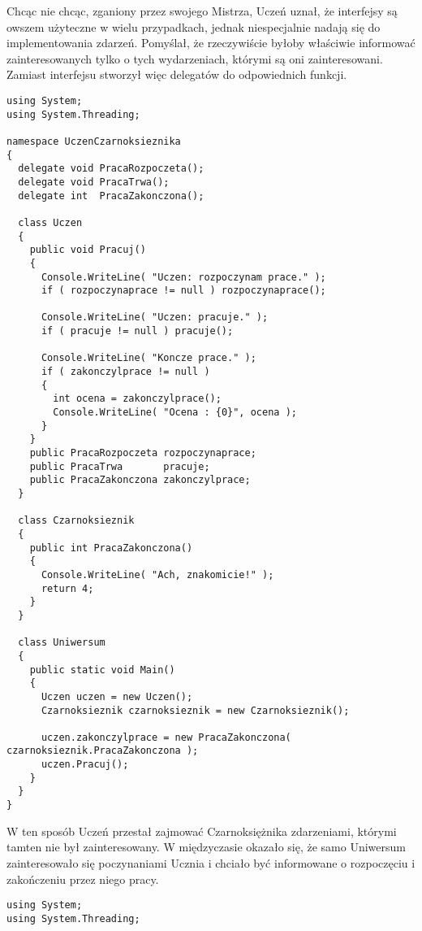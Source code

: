 {Chcąc nie chcąc, zganiony przez swojego Mistrza, Uczeń uznał, 
że interfejsy są owszem użyteczne w wielu przypadkach, jednak
niespecjalnie nadają się do implementowania zdarzeń. Pomyślał, że rzeczywiście byłoby właściwie informować
zainteresowanych tylko o tych wydarzeniach, którymi są oni zainteresowani. Zamiast interfejsu stworzył
więc delegatów do odpowiednich funkcji.

\begin{scriptsize}
\begin{verbatim}
using System;
using System.Threading;

namespace UczenCzarnoksieznika
{	
  delegate void PracaRozpoczeta();
  delegate void PracaTrwa();
  delegate int  PracaZakonczona();
  
  class Uczen
  {
    public void Pracuj()
    {
      Console.WriteLine( "Uczen: rozpoczynam prace." );
      if ( rozpoczynaprace != null ) rozpoczynaprace();
  		
      Console.WriteLine( "Uczen: pracuje." );
      if ( pracuje != null ) pracuje();
  	  
      Console.WriteLine( "Koncze prace." );
      if ( zakonczylprace != null ) 
      {
        int ocena = zakonczylprace();
        Console.WriteLine( "Ocena : {0}", ocena );
      }
    }
    public PracaRozpoczeta rozpoczynaprace;
    public PracaTrwa       pracuje;
    public PracaZakonczona zakonczylprace;
  }
  
  class Czarnoksieznik 
  {
    public int PracaZakonczona() 
    {
      Console.WriteLine( "Ach, znakomicie!" );
      return 4;
    }
  }
  
  class Uniwersum
  {
    public static void Main()
    {
      Uczen uczen = new Uczen();
      Czarnoksieznik czarnoksieznik = new Czarnoksieznik();
  		
      uczen.zakonczylprace = new PracaZakonczona( czarnoksieznik.PracaZakonczona );  		
      uczen.Pracuj();
    }
  }
}
\end{verbatim}
\end{scriptsize}

W ten sposób Uczeń przestał zajmować Czarnoksiężnika zdarzeniami, którymi tamten nie był zainteresowany.
W międzyczasie okazało się, że samo Uniwersum zainteresowało się poczynaniami Ucznia i chciało być informowane o
rozpoczęciu i zakończeniu przez niego pracy.

\begin{scriptsize}
\begin{verbatim}
using System;
using System.Threading;


\end{verbatim}
\end{scriptsize}}

